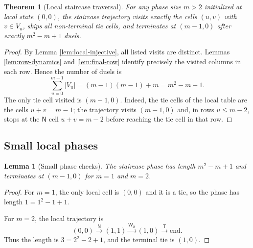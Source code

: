 \documentclass[11pt]{article}
\newtheorem{theorem}{Theorem}
\newtheorem{lemma}{Lemma}
\theoremstyle{definition}
\theoremstyle{remark}
\newcommand{\WA}{\mathsf{W_A}}
\newcommand{\TT}{\mathsf{T}}
\newcommand{\NN}{\mathsf{N}}
\begin{document}
\begin{theorem}[Local staircase traversal]\label{thm:local-staircase}
For any phase size $m>2$ initialized at local state $(0,0)$, the staircase trajectory visits exactly the cells $(u,v)$ with $v\in V_u$, skips all non-terminal tie cells, and terminates at $(m-1,0)$ after exactly $m^2-m+1$ duels.
\end{theorem}
\begin{proof}
By Lemma \ref{lem:local-injective}, all listed visits are distinct. Lemmas \ref{lem:row-dynamics} and \ref{lem:final-row} identify precisely the visited columns in each row. Hence the number of duels is
\[
\sum_{u=0}^{m-1}|V_u|=(m-1)(m-1)+m=m^2-m+1.
\]
The only tie cell visited is $(m-1,0)$. Indeed, the tie cells of the local table are the cells $u+v=m-1$; the trajectory visits $(m-1,0)$ and, in rows $u\le m-2$, stops at the $\NN$ cell $u+v=m-2$ before reaching the tie cell in that row.
\end{proof}

\subsection{Small local phases}
\begin{lemma}[Small phase checks]\label{lem:small-local}
The staircase phase has length $m^2-m+1$ and terminates at $(m-1,0)$ for $m=1$ and $m=2$.
\end{lemma}
\begin{proof}
For $m=1$, the only local cell is $(0,0)$ and it is a tie, so the phase has length $1=1^2-1+1$.

For $m=2$, the local trajectory is
\[
(0,0)\xrightarrow{\NN}(1,1)\xrightarrow{\WA}(1,0)\xrightarrow{\TT}\text{end}.
\]
Thus the length is $3=2^2-2+1$, and the terminal tie is $(1,0)$.
\end{proof}
\end{document}
